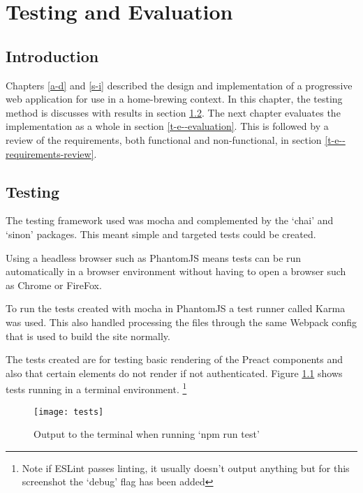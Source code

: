 \chapter{Testing and Evaluation} \label{t-e}

\section{Introduction} \label{t-e--introduction}

Chapters \ref{a-d} and \ref{s-i} described the design and implementation of a progressive web application for use in a home-brewing context. In this chapter, the testing method is discusses with results in section \ref{t-e--testing}. The next chapter evaluates the implementation as a whole in section \ref{t-e--evaluation}. This is followed by a review of the requirements, both functional and non-functional, in section \ref{t-e--requirements-review}.

\section{Testing} \label{t-e--testing}

The testing framework used was mocha and complemented by the `chai' and `sinon' packages. This meant simple and targeted tests could be created. \cite{mocha}

Using a headless browser such as PhantomJS means tests can be run automatically in a browser environment without having to open a browser such as Chrome or FireFox. \cite{phantomjs}

To run the tests created with mocha in PhantomJS a test runner called Karma was used. \cite{karma} This also handled processing the files through the same Webpack config that is used to build the site normally.

The tests created are for testing basic rendering of the Preact components and also that certain elements do not render if not authenticated. Figure \ref{figure-tests} shows tests running in a terminal environment. \footnote{Note if ESLint passes linting, it usually doesn't output anything but for this screenshot the `debug' flag has been added}

\begin{figure}[H]
  \centering
    \texttt{[image: tests]}
  \caption{Output to the terminal when running `npm run test'}
  \label{figure-tests}
\end{figure}

